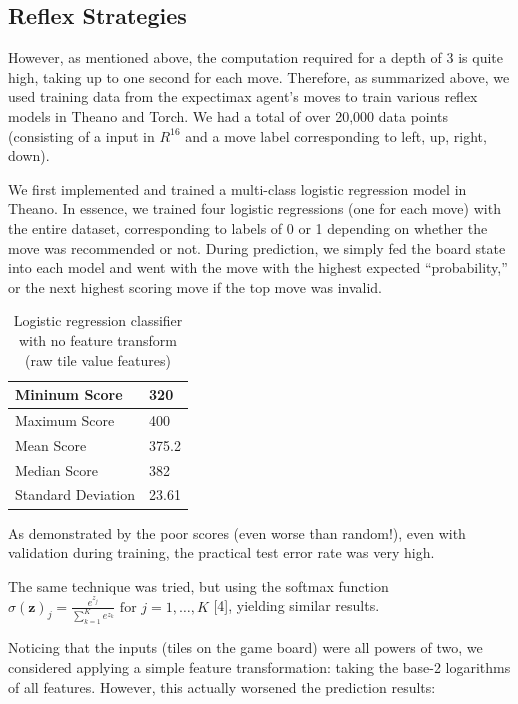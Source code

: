 \documentclass[9pt,twocolumn]{article}
\begin{document}
\subsection{Reflex Strategies}

However, as mentioned above, the computation required for a depth of 3 is quite high, taking up to one second for each move. Therefore, as summarized above, we used training data from the expectimax agent’s moves to train various reflex models in Theano and Torch. We had a total of over 20,000 data points (consisting of a input in $R^{16}$ and a move label corresponding to left, up, right, down). 

We first implemented and trained a multi-class logistic regression model in Theano. In essence, we trained four logistic regressions (one for each move) with the entire dataset, corresponding to labels of 0 or 1 depending on whether the move was recommended or not. During prediction, we simply fed the board state into each model and went with the move with the highest expected “probability,” or the next highest scoring move if the top move was invalid. 

\begin{table}[!htbp]

\centering

\begin{tabular}{|l|l|}
\hline
Mininum Score      & 320 \\ \hline
Maximum Score      & 400 \\ \hline
Mean Score         & 375.2 \\ \hline
Median Score       & 382 \\ \hline
Standard Deviation & 23.61 \\ \hline
\end{tabular}

\caption{Logistic regression classifier with no feature transform (raw tile value features)}

\end{table}

As demonstrated by the poor scores (even worse than random!), even with validation during training, the practical test error rate was very high. 

The same technique was tried, but using the softmax function $\sigma(\mathbf{z})_j = \frac{e^{z_j}}{\sum_{k=1}^K e^{z_k}} \text{ for } j = 1, \dots, K$ [4], yielding similar results. 

Noticing that the inputs (tiles on the game board) were all powers of two, we considered applying a simple feature transformation: taking the base-2 logarithms of all features. However, this actually worsened the prediction results:
\end{document}
